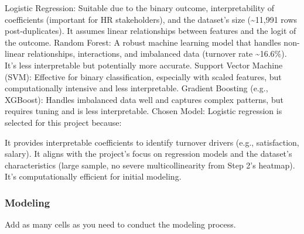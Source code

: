 \documentclass[11pt]{article}
\begin{document}
Logistic Regression: Suitable due to the binary outcome,
interpretability of coefficients (important for HR stakeholders), and
the dataset's size (\textasciitilde11,991 rows post-duplicates). It
assumes linear relationships between features and the logit of the
outcome. Random Forest: A robust machine learning model that handles
non-linear relationships, interactions, and imbalanced data (turnover
rate \textasciitilde16.6\%). It's less interpretable but potentially
more accurate. Support Vector Machine (SVM): Effective for binary
classification, especially with scaled features, but computationally
intensive and less interpretable. Gradient Boosting (e.g., XGBoost):
Handles imbalanced data well and captures complex patterns, but requires
tuning and is less interpretable. Chosen Model: Logistic regression is
selected for this project because:

It provides interpretable coefficients to identify turnover drivers
(e.g., satisfaction, salary). It aligns with the project's focus on
regression models and the dataset's characteristics (large sample, no
severe multicollinearity from Step 2's heatmap). It's computationally
efficient for initial modeling.

    \hypertarget{modeling}{%
\subsubsection{Modeling}\label{modeling}}

Add as many cells as you need to conduct the modeling process.
\end{document}
